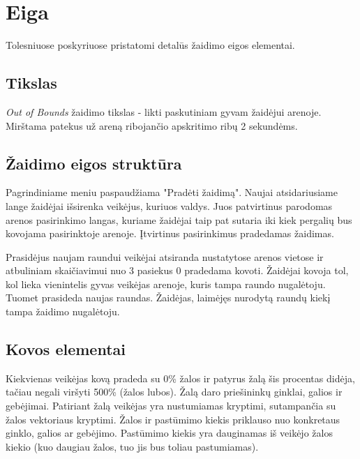 \documentclass{VUMIFPSkursinis}
\begin{document}
\section{Eiga}
Tolesniuose poskyriuose pristatomi detalūs žaidimo eigos elementai.


\subsection{Tikslas}
\textit{Out of Bounds} žaidimo tikslas - likti paskutiniam gyvam žaidėjui arenoje. Mirštama patekus už areną ribojančio apskritimo ribų 2 sekundėms.


\subsection{Žaidimo eigos struktūra}
Pagrindiniame meniu paspaudžiama "Pradėti žaidimą". Naujai atsidariusiame lange žaidėjai išsirenka veikėjus, kuriuos valdys. Juos patvirtinus parodomas arenos pasirinkimo langas, kuriame žaidėjai taip pat sutaria iki kiek pergalių bus kovojama pasirinktoje arenoje. Įtvirtinus pasirinkimus pradedamas žaidimas.

Prasidėjus naujam raundui veikėjai atsiranda nustatytose arenos vietose ir atbuliniam skaičiavimui nuo 3 pasiekus 0 pradedama kovoti. Žaidėjai kovoja tol, kol lieka vienintelis gyvas veikėjas arenoje, kuris tampa raundo nugalėtoju. Tuomet prasideda naujas raundas. Žaidėjas, laimėjęs nurodytą raundų kiekį tampa žaidimo nugalėtoju.


\subsection{Kovos elementai}
Kiekvienas veikėjas kovą pradeda su 0\% žalos ir patyrus žalą šis procentas didėja, tačiau negali viršyti 500\% (žalos lubos). Žalą daro priešininkų ginklai, galios ir gebėjimai. Patiriant žalą veikėjas yra nustumiamas kryptimi, sutampančia su žalos vektoriaus kryptimi. Žalos ir pastūmimo kiekis priklauso nuo konkretaus ginklo, galios ar gebėjimo. Pastūmimo kiekis yra dauginamas iš veikėjo žalos kiekio (kuo daugiau žalos, tuo jis bus toliau pastumiamas).
\end{document}
